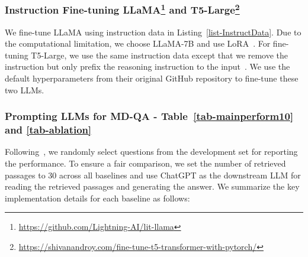 \subsubsection{Instruction Fine-tuning LLaMA\footnote{\url{https://github.com/Lightning-AI/lit-llama}} and T5-Large\footnote{\url{https://shivanandroy.com/fine-tune-t5-transformer-with-pytorch/}}} We fine-tune LLaMA using instruction data in Listing~\ref{list-InstructData}. Due to the computational limitation, we choose LLaMA-7B and use LoRA~\cite{hu2021lora}. For fine-tuning T5-Large, we use the same instruction data except that we remove the instruction but only prefix the reasoning instruction to the input~\cite{raffel2020exploring}. We use the default hyperparameters from their original GitHub repository to fine-tune these two LLMs.


\subsubsection{Prompting LLMs for MD-QA - Table~\ref{tab-mainperform10} and \ref{tab-ablation}}
Following~\cite{trivedi2022interleaving}, we randomly select questions from the development set for reporting the performance. To ensure a fair comparison, we set the number of retrieved passages to 30 across all baselines and use ChatGPT as the downstream LLM for reading the retrieved passages and generating the answer. We summarize the key implementation details for each baseline as follows:
